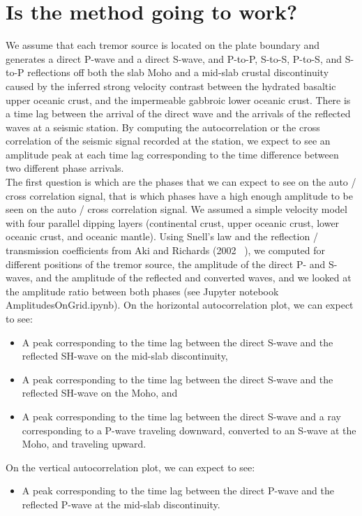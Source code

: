 \documentclass[main.tex]{subfiles}
\begin{document}
\section{Is the method going to work?}

We assume that each tremor source is located on the plate boundary and generates a direct P-wave and a direct S-wave, and P-to-P, S-to-S, P-to-S, and S-to-P reflections off both the slab Moho and a mid-slab crustal discontinuity caused by the inferred strong velocity contrast between the hydrated basaltic upper oceanic crust, and the impermeable gabbroic lower oceanic crust. There is a time lag between the arrival of the direct wave and the arrivals of the reflected waves at a seismic station. By computing the autocorrelation or the cross correlation of the seismic signal recorded at the station, we expect to see an amplitude peak at each time lag corresponding to the time difference between two different phase arrivals. \\

The first question is which are the phases that we can expect to see on the auto / cross correlation signal, that is which phases have a high enough amplitude to be seen on the auto / cross correlation signal. We assumed a simple velocity model with four parallel dipping layers (continental crust, upper oceanic crust, lower oceanic crust, and oceanic mantle). Using Snell's law and the reflection / transmission coefficients from Aki and Richards (2002 ~\cite{AKI_2002}), we computed for different positions of the tremor source, the amplitude of the direct P- and S-waves, and the amplitude of the reflected and converted waves, and we looked at the amplitude ratio between both phases (see Jupyter notebook AmplitudesOnGrid.ipynb). On the horizontal autocorrelation plot, we can expect to see:

\begin{itemize}
\item A peak corresponding to the time lag between the direct S-wave and the reflected SH-wave on the mid-slab discontinuity,
\item A peak corresponding to the time lag between the direct S-wave and the reflected SH-wave on the Moho, and
\item A peak corresponding to the time lag between the direct S-wave and a ray corresponding to a P-wave traveling downward, converted to an S-wave at the Moho, and traveling upward.
\end{itemize}

On the vertical autocorrelation plot, we can expect to see:
\begin{itemize}
\item A peak corresponding to the time lag between the direct P-wave and the reflected P-wave at the mid-slab discontinuity.
\end{itemize}
\end{document}
